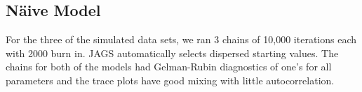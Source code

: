 \documentclass[11pt]{article}\usepackage[]{graphicx}\usepackage[]{color}
\begin{document}
 

\subsection{N{\"a}ive Model}

For the three of the simulated data sets, we ran 3 chains of 10,000 iterations each with 2000 burn in. JAGS automatically selects dispersed starting values. The chains for both of the models had Gelman-Rubin diagnostics of one's for all parameters and the trace plots have good mixing with little autocorrelation. 
\end{document}
